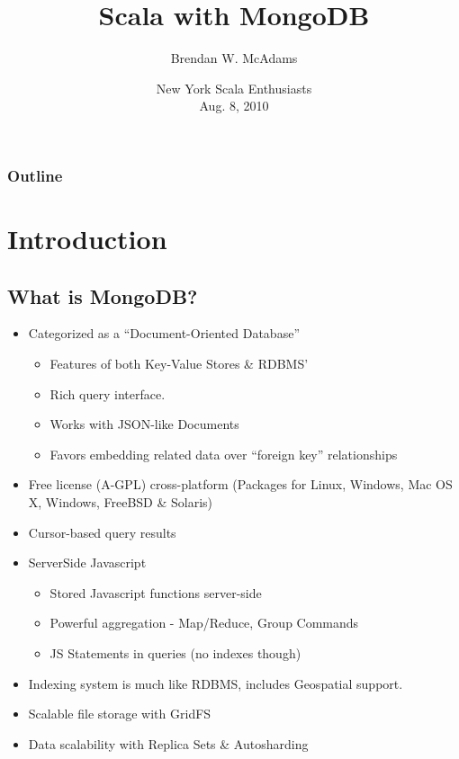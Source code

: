 \documentclass{beamer}
\title[Integrating Scala + MongoDB]{Scala with MongoDB} %
\author[B.W. McAdams]{Brendan W. McAdams}
\institute[Novus Partners]{Novus Partners, Inc.}
\date[NY Scala Enthusiasts - 8/8/10]
     {New York Scala Enthusiasts\\ Aug. 8, 2010}
\newenvironment{itemizeframe}
               {\begin{frame}\startitemizeframe} 
               {\stopitemizeframe\end{frame}}
\newcommand\startitemizeframe{\begin{itemize}} \newcommand\stopitemizeframe{\end{itemize}}
\begin{document}
\begin{frame}
  \titlepage
\end{frame}

\begin{frame}
\frametitle{Outline}
  \tableofcontents
\end{frame}

\section{Introduction}

\subsection{What is MongoDB?}

\begin{itemizeframe}
\frametitle{Introducing MongoDB}
    \item Categorized as a ``Document-Oriented Database''
        \begin{itemize}
            \item<2-> Features of both Key-Value Stores \& RDBMS'
            \item<2-> Rich query interface.
            \item<2-> Works with JSON-like Documents
            \item<2-> Favors embedding related data over ``foreign key'' relationships
        \end{itemize}
    \item<3-> Free license (A-GPL) cross-platform (Packages for Linux, Windows, Mac OS X, Windows, FreeBSD \& Solaris)
    \item<4-> Cursor-based query results 
    \item<5-> ServerSide Javascript
        \begin{itemize}
            \item<5-> Stored Javascript functions server-side
            \item<5-> Powerful aggregation - Map/Reduce, Group Commands
            \item<5-> JS Statements in queries (no indexes though)
        \end{itemize}
    \item<6-> Indexing system is much like RDBMS, includes Geospatial support.
    \item<7-> Scalable file storage with GridFS
    \item<8-> Data scalability with Replica Sets \& Autosharding
\end{itemizeframe}
\end{document}
